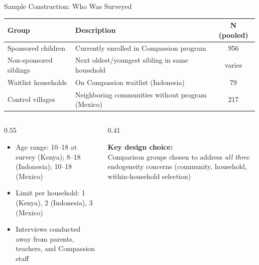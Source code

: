 \documentclass[aspectratio=169, 10pt]{beamer}
\begin{document}
\begin{frame}{Sample Construction: Who Was Surveyed}
  \begin{center}
  \begin{tabular}{lp{6cm}c}
    \toprule
    \textbf{Group} & \textbf{Description} & \textbf{N (pooled)} \\
    \midrule
    Sponsored children    & Currently enrolled in Compassion program & 956 \\
    Non-sponsored siblings & Next oldest/youngest sibling in same household & varies \\
    Waitlist households   & On Compassion waitlist (Indonesia) & 79 \\
    Control villages      & Neighboring communities without program (Mexico) & 217 \\
    \bottomrule
  \end{tabular}
  \end{center}
  \vspace{0.4em}
  \begin{columns}
    \begin{column}{0.55\textwidth}
      \begin{itemize}
        \item Age range: 10--18 at survey (Kenya); 8--18 (Indonesia); 10--18 (Mexico)
        \item Limit per household: 1 (Kenya), 2 (Indonesia), 3 (Mexico)
        \item Interviews conducted away from parents, teachers, and Compassion staff
      \end{itemize}
    \end{column}
    \begin{column}{0.41\textwidth}
      \begin{methodbox}
        \textbf{Key design choice:}\\[0.3em]
        Comparison groups chosen to address \emph{all three} endogeneity concerns (community, household, within-household selection)
      \end{methodbox}
    \end{column}
  \end{columns}
\end{frame}
\end{document}

